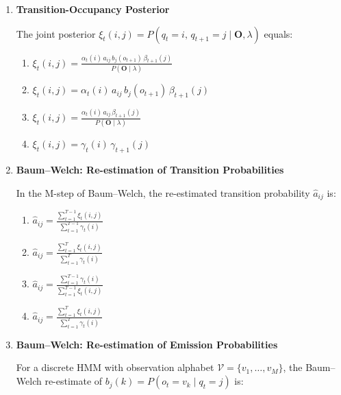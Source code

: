 \documentclass[12pt]{article}
\begin{document}
\begin{enumerate}[label=\textbf{Q\arabic*.}, leftmargin=*, itemsep=2em]
\item \textbf{Transition-Occupancy Posterior}

The joint posterior $\xi_t(i,j) = P(q_t=i,\,q_{t+1}=j\mid\mathbf{O},\lambda)$ equals:

\begin{enumerate}[label=\Alph*.]
    \item $\displaystyle \xi_t(i,j)
          = \frac{\alpha_t(i)\,a_{ij}\,b_j(o_{t+1})\,\beta_{t+1}(j)}{P(\mathbf{O}\mid\lambda)}$
    \item $\displaystyle \xi_t(i,j)
          = \alpha_t(i)\,a_{ij}\,b_j(o_{t+1})\,\beta_{t+1}(j)$
    \item $\displaystyle \xi_t(i,j)
          = \frac{\alpha_t(i)\,a_{ij}\,\beta_{t+1}(j)}{P(\mathbf{O}\mid\lambda)}$
    \item $\displaystyle \xi_t(i,j)
          = \gamma_t(i)\,\gamma_{t+1}(j)$
\end{enumerate}

\item \textbf{Baum--Welch: Re-estimation of Transition Probabilities}

In the M-step of Baum--Welch, the re-estimated transition probability $\hat{a}_{ij}$ is:

\begin{enumerate}[label=\Alph*.]
    \item $\displaystyle \hat{a}_{ij}
          = \frac{\displaystyle\sum_{t=1}^{T-1}\xi_t(i,j)}
                 {\displaystyle\sum_{t=1}^{T-1}\gamma_t(i)}$
    \item $\displaystyle \hat{a}_{ij}
          = \frac{\displaystyle\sum_{t=1}^{T}\xi_t(i,j)}
                 {\displaystyle\sum_{t=1}^{T}\gamma_t(i)}$
    \item $\displaystyle \hat{a}_{ij}
          = \frac{\displaystyle\sum_{t=1}^{T-1}\gamma_t(i)}
                 {\displaystyle\sum_{t=1}^{T-1}\xi_t(i,j)}$
    \item $\displaystyle \hat{a}_{ij}
          = \frac{\displaystyle\sum_{t=1}^{T}\xi_t(i,j)}
                 {\displaystyle\sum_{t=1}^{T}\gamma_t(i)}$
\end{enumerate}

\item \textbf{Baum--Welch: Re-estimation of Emission Probabilities}

For a discrete HMM with observation alphabet $\mathcal{V} = \{v_1,\dots,v_M\}$,
the Baum--Welch re-estimate of $b_j(k) = P(o_t = v_k \mid q_t = j)$ is:


\end{enumerate}
\end{document}
